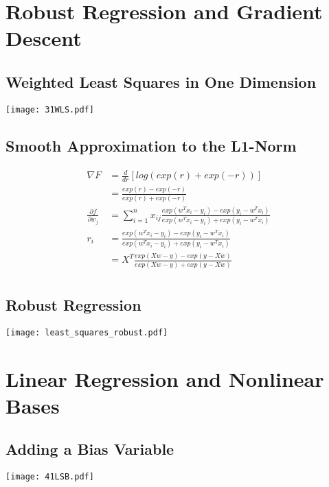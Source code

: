 \documentclass{article}
\begin{document}
\section{Robust Regression and Gradient Descent}
\subsection{Weighted Least Squares in One Dimension}
\texttt{[image: 31WLS.pdf]}

\subsection{Smooth Approximation to the L1-Norm}
\begin{equation*}
    \begin{split}
    \nabla F &= \frac{d}{dr}[log(exp(r)+exp(-r))]\\
    &= \frac{exp(r)-exp(-r)}{exp(r)+exp(-r)}\\
    \frac{\partial f}{\partial w_j} &= \sum_{i=1}^n  x_{ij} \frac{exp(w^Tx_i-y_i)-exp(y_i-w^Tx_i)}{exp(w^Tx_i-y_i)+exp(y_i-w^Tx_i)}\\
    r_i &= \frac{exp(w^Tx_i-y_i)-exp(y_i-w^Tx_i)}{exp(w^Tx_i-y_i)+exp(y_i-w^Tx_i)}\\
    &= X^T\frac{exp(Xw-y)-exp(y-Xw)}{exp(Xw-y)+exp(y-Xw)}\\
    \end{split}
\end{equation*}
\subsection{Robust Regression}
\texttt{[image: least\_squares\_robust.pdf]}

\section{Linear Regression and Nonlinear Bases}
\subsection{Adding a Bias Variable}
\texttt{[image: 41LSB.pdf]}
\end{document}
